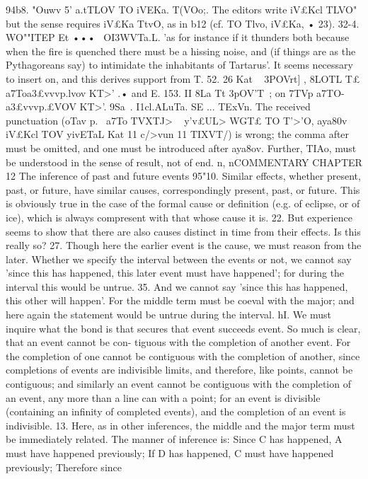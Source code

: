 {{{{{{{{{{{{{{{{{{{{{{{{{{{{{{{{{{{{{{{{{{{{{{{{{{{{{{{{{{{94b8. "Ouwv 5' a.tTLOV TO iVEKa. T(VOo;. The editors write iV£Kcl
TLVO" but the sense requires iV£Ka TtvO, as in b12 (cf. TO Tlvo,
iV£Ka, • 23).
32-4. WO""ITEP Et ••• ~OI3WVTa.L. 'as for instance if it thunders
both because when the fire is quenched there must be a hissing
noise, and (if things are as the Pythagoreans say) to intimidate
the inhabitants of Tartarus'. It seems necessary to insert on,
and this derives support from T. 52. 26 Kat ~ {3POVrt] , 8LOTL T£
a7Toa{3£vvvp.lvov KT>' .• and E. 153. II 8La Tt {3pOV'T~; on 7TVp a7TO-
a{3£vvvp.£VOV KT>'.
9Sa~. I1cl.ALuTa. SE ... TExVn. The received punctuation (oTav
p.~ a7To TVXTJ> ~ y'v£UL>
WGT£ TO T'>'O, aya80v iV£Kcl TOV yivETaL Kat
11 c/>vun 11 TIXVT/) is wrong; the comma after must be omitted, and
one must be introduced after aya8ov. Further, TIAo, must be
understood in the sense of result, not of end.
n,
nCOMMENTARY
CHAPTER 12
The inference of past and future events
95"10. Similar effects, whether present, past, or future, have
similar causes, correspondingly present, past, or future. This
is obviously true in the case of the formal cause or definition
(e.g. of eclipse, or of ice), which is always compresent with that
whose cause it is.
22. But experience seems to show that there are also causes
distinct in time from their effects. Is this really so?
27. Though here the earlier event is the cause, we must reason
from the later. Whether we specify the interval between the
events or not, we cannot say 'since this has happened, this later
event must have happened'; for during the interval this would
be untrue.
35. And we cannot say 'since this has happened, this other
will happen'. For the middle term must be coeval with the major;
and here again the statement would be untrue during the interval.
hI. We must inquire what the bond is that secures that event
succeeds event. So much is clear, that an event cannot be con-
tiguous with the completion of another event. For the completion
of one cannot be contiguous with the completion of another,
since completions of events are indivisible limits, and therefore,
like points, cannot be contiguous; and similarly an event cannot
be contiguous with the completion of an event, any more than
a line can with a point; for an event is divisible (containing an
infinity of completed events), and the completion of an event is
indivisible.
13. Here, as in other inferences, the middle and the major term
must be immediately related. The manner of inference is: Since
C has happened, A must have happened previously; If D has
happened, C must have happened previously; Therefore since
}}}}}}}}}}}}}}}}}}}}}}}}}}}}}}}}}}}}}}}}}}}}}}}}}}}}}}}}}}}}}}}
